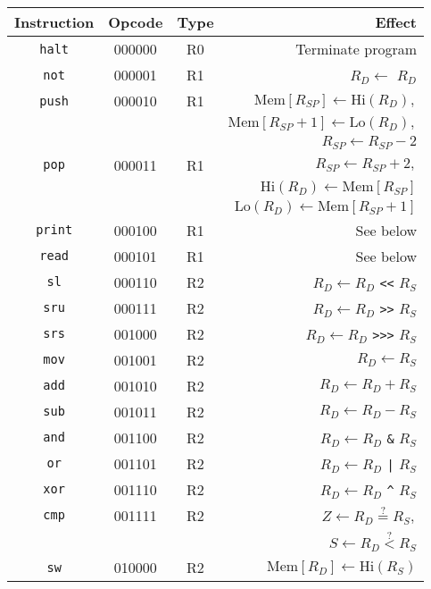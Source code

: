 \documentclass[12pt]{scrartcl}
\newcommand{\textapprox}{\raisebox{0.5ex}{\texttildelow}}
\begin{document}
\begin{center}
  \begin{longtable}{c c c r}
    \textbf{Instruction} & \textbf{Opcode} & \textbf{Type} & \textbf{Effect} \\
    \hline \hline
    \texttt{halt} & 000000 & R0 & Terminate program \\
    \texttt{not}  & 000001 & R1 & $R_D \gets$ \texttt{\textapprox} $R_D$ \\
    \texttt{push} & 000010 & R1 & $\mathrm{Mem}[R_{SP}] \gets \mathrm{Hi}(R_D),$ \\
    & & &                         $\mathrm{Mem}[R_{SP}+1] \gets \mathrm{Lo}(R_D),$ \\
    & & &                         $R_{SP} \gets R_{SP} - 2$ \\
    \texttt{pop}  & 000011 & R1 & $R_{SP} \gets R_{SP} + 2,$ \\
    & & &                         $\mathrm{Hi}(R_D) \gets \mathrm{Mem}[R_{SP}]$ \\
    & & &                         $\mathrm{Lo}(R_D) \gets \mathrm{Mem}[R_{SP}+1]$ \\
    \texttt{print}& 000100 & R1 & See below \\
    \texttt{read} & 000101 & R1 & See below \\
    \texttt{sl}   & 000110 & R2 & $R_D \gets R_D$ \texttt{<<} $R_S$ \\
    \texttt{sru}  & 000111 & R2 & $R_D \gets R_D$ \texttt{>>} $R_S$ \\
    \texttt{srs}  & 001000 & R2 & $R_D \gets R_D$ \texttt{>>>} $R_S$ \\
    \texttt{mov}  & 001001 & R2 & $R_D \gets R_S$ \\
    \texttt{add}  & 001010 & R2 & $R_D \gets R_D + R_S$ \\
    \texttt{sub}  & 001011 & R2 & $R_D \gets R_D - R_S$ \\
    \texttt{and}  & 001100 & R2 & $R_D \gets R_D$ \texttt{\&} $R_S$ \\
    \texttt{or}   & 001101 & R2 & $R_D \gets R_D$ \texttt{|} $R_S$ \\
    \texttt{xor}  & 001110 & R2 & $R_D \gets R_D$ \texttt{\^{}} $R_S$ \\
    \texttt{cmp}  & 001111 & R2 & $Z \gets R_D \stackrel{?}{=} R_S,$ \\
    & & &                         $S \gets R_D \stackrel{?}{<} R_S$ \\
    \texttt{sw}   & 010000 & R2 & $\mathrm{Mem}[R_D] \gets \mathrm{Hi}(R_S)$ \\

\end{longtable}
\end{center}
\end{document}

